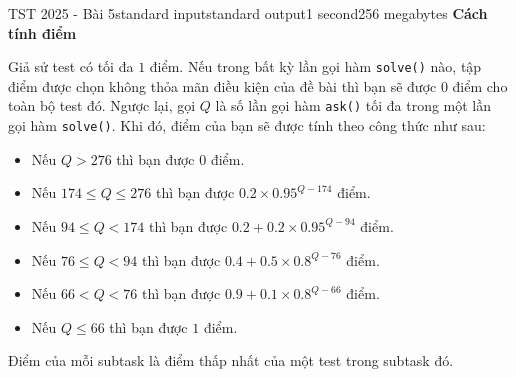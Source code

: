 \begin{problem}{TST 2025 - Bài 5}{standard input}{standard output}{1 second}{256 megabytes}
\textbf{Cách tính điểm}

Giả sử test có tối đa $1$ điểm. Nếu trong bất kỳ lần gọi hàm \texttt{solve()} nào, tập điểm được chọn không thỏa mãn điều kiện của đề bài thì bạn sẽ được $0$ điểm cho toàn bộ test đó. Ngược lại, gọi $Q$ là số lần gọi hàm \texttt{ask()} tối đa trong một lần gọi hàm \texttt{solve()}. Khi đó, điểm của bạn sẽ được tính theo công thức như sau:
\begin{itemize}
   \item Nếu $Q>276$ thì bạn được $0$ điểm.
   \item Nếu $174 \le Q\le 276$ thì bạn được $0.2 \times 0.95^{Q-174}$ điểm.
   \item Nếu $94 \le Q< 174$ thì bạn được $0.2 + 0.2 \times 0.95^{Q-94}$ điểm.
   \item Nếu $76\le Q< 94$ thì bạn được $0.4 + 0.5 \times 0.8^{Q-76}$ điểm.
   \item Nếu $66<Q<76$ thì bạn được $0.9 + 0.1 \times 0.8^{Q-66}$ điểm.
   \item Nếu $Q\le 66$ thì bạn được $1$ điểm.
\end{itemize}

Điểm của mỗi subtask là điểm thấp nhất của một test trong subtask đó.


\end{problem}

